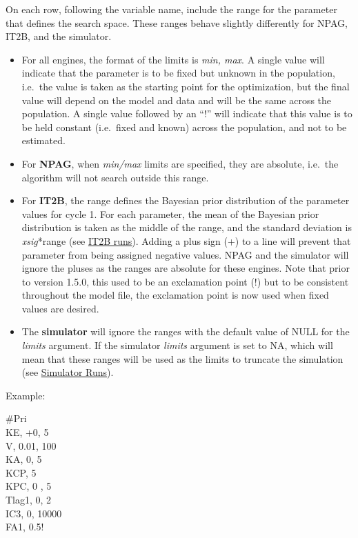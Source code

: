\documentclass[
]{book}
\begin{document}
On each row, following the variable name, include the range for the
parameter that defines the search space. These ranges behave slightly
differently for NPAG, IT2B, and the simulator.

\begin{itemize}
\item
  For all engines, the format of the limits is \emph{min, max}. A single
  value will indicate that the parameter is to be fixed but unknown in
  the population, i.e.~the value is taken as the starting point for
  the optimization, but the final value will depend on the model and
  data and will be the same across the population. A single value
  followed by an ``!'' will indicate that this value is to be held
  constant (i.e.~fixed and known) across the population, and not to be
  estimated.
\item
  For \textbf{NPAG}, when \emph{min/max} limits are specified, they are
  absolute, i.e.~the algorithm will not search outside this range.
\item
  For \textbf{IT2B}, the range defines the Bayesian prior distribution of
  the parameter values for cycle 1. For each parameter, the mean of
  the Bayesian prior distribution is taken as the middle of the range,
  and the standard deviation is \emph{xsig}*range (see \href{/l}{\underline{IT2B
  runs}}). Adding a plus sign (+) to a line will
  prevent that parameter from being assigned negative values. NPAG and
  the simulator will ignore the pluses as the ranges are absolute for
  these engines. Note that prior to version 1.5.0, this used to be an
  exclamation point (!) but to be consistent throughout the model
  file, the exclamation point is now used when fixed values are
  desired.
\item
  The \textbf{simulator} will ignore the ranges with the default value of
  NULL for the \emph{limits} argument. If the simulator \emph{limits} argument
  is set to NA, which will mean that these ranges will be used as the
  limits to truncate the simulation (see \href{/l}{\underline{Simulator
  Runs}}).
\end{itemize}

Example:

\#Pri\\
KE, +0, 5\\
V, 0.01, 100\\
KA, 0, 5\\
KCP, 5\\
KPC, 0 , 5\\
Tlag1, 0, 2\\
IC3, 0, 10000\\
FA1, 0.5!
\end{document}
